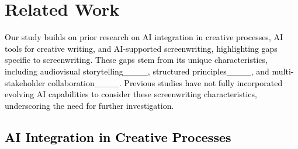 \section{Related Work}
\textcolor{black}{Our study builds on prior research on AI integration in creative processes, AI tools for creative writing, and AI-supported screenwriting, highlighting gaps specific to screenwriting. These gaps stem from its unique characteristics, including audiovisual storytelling____, structured principles____, and multi-stakeholder collaboration____. Previous studies have not fully incorporated evolving AI capabilities to consider these screenwriting characteristics, underscoring the need for further investigation.}





\subsection{\textcolor{black}{AI Integration in Creative Processes}}

